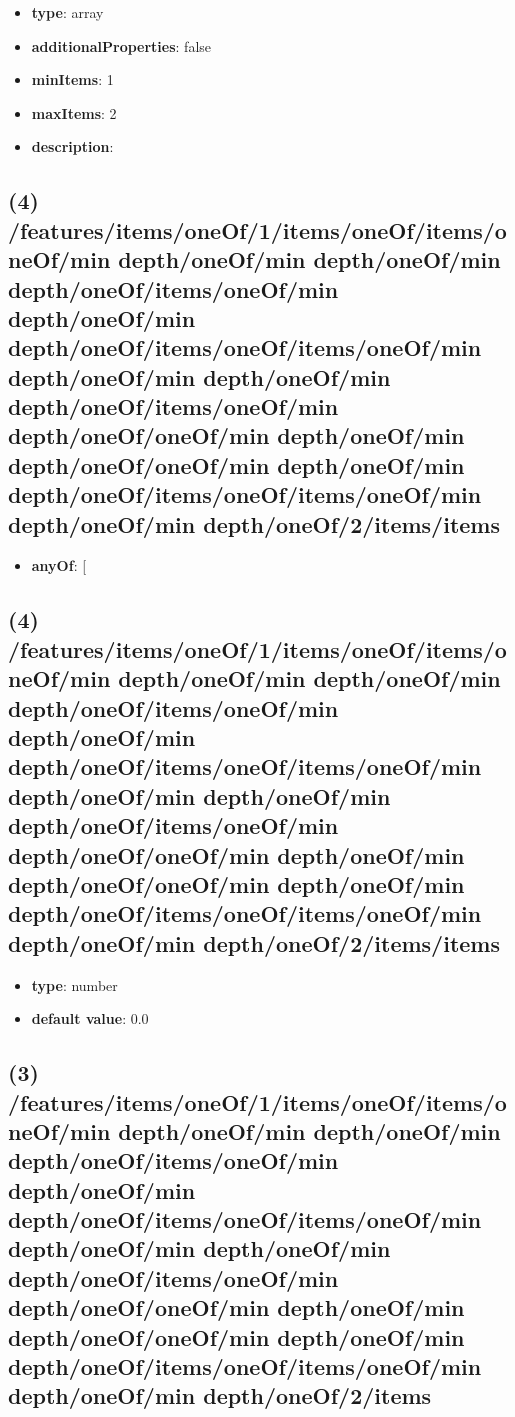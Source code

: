 \begin{itemize}[leftmargin=3em]\item {\bf type}: array
\item {\bf additionalProperties}: false
\item {\bf minItems}: 1
\item {\bf maxItems}: 2
\item {\bf description}: 
\end{itemize}\subsection{(4) /features/items/oneOf/1/items/oneOf/items/oneOf/min depth/oneOf/min depth/oneOf/min depth/oneOf/items/oneOf/min depth/oneOf/min depth/oneOf/items/oneOf/items/oneOf/min depth/oneOf/min depth/oneOf/min depth/oneOf/items/oneOf/min depth/oneOf/oneOf/min depth/oneOf/min depth/oneOf/oneOf/min depth/oneOf/min depth/oneOf/items/oneOf/items/oneOf/min depth/oneOf/min depth/oneOf/2/items/items}
\begin{itemize}[leftmargin=4em]\item {\bf anyOf}: [\end{itemize}\subsection{(4) /features/items/oneOf/1/items/oneOf/items/oneOf/min depth/oneOf/min depth/oneOf/min depth/oneOf/items/oneOf/min depth/oneOf/min depth/oneOf/items/oneOf/items/oneOf/min depth/oneOf/min depth/oneOf/min depth/oneOf/items/oneOf/min depth/oneOf/oneOf/min depth/oneOf/min depth/oneOf/oneOf/min depth/oneOf/min depth/oneOf/items/oneOf/items/oneOf/min depth/oneOf/min depth/oneOf/2/items/items}
\begin{itemize}[leftmargin=4em]\item {\bf type}: number\item {\bf default value}: 0.0
\end{itemize}\subsection{(3) /features/items/oneOf/1/items/oneOf/items/oneOf/min depth/oneOf/min depth/oneOf/min depth/oneOf/items/oneOf/min depth/oneOf/min depth/oneOf/items/oneOf/items/oneOf/min depth/oneOf/min depth/oneOf/min depth/oneOf/items/oneOf/min depth/oneOf/oneOf/min depth/oneOf/min depth/oneOf/oneOf/min depth/oneOf/min depth/oneOf/items/oneOf/items/oneOf/min depth/oneOf/min depth/oneOf/2/items}
